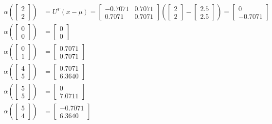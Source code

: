 \documentclass[fleqn]{article}
\begin{document}
\begin{description}
\begin{align*}
        \alpha \left ( \begin{bmatrix}2 \\ 2\end{bmatrix} \right ) &= U^T(x - \mu) = \begin{bmatrix} -0.7071 & 0.7071 \\ 0.7071 & 0.7071 \end{bmatrix} \left ( \begin{bmatrix}2 \\ 2\end{bmatrix} - \begin{bmatrix} 2.5 \\ 2.5 \end{bmatrix} \right ) = \begin{bmatrix}0 \\ -0.7071\end{bmatrix} \\
        \alpha \left ( \begin{bmatrix}0 \\ 0\end{bmatrix} \right ) &= \begin{bmatrix} 0 \\ 0 \end{bmatrix} \\
        \alpha \left ( \begin{bmatrix}0 \\ 1\end{bmatrix} \right ) &= \begin{bmatrix} 0.7071 \\ 0.7071 \end{bmatrix} \\
        \alpha \left ( \begin{bmatrix}4 \\ 5\end{bmatrix} \right ) &= \begin{bmatrix} 0.7071 \\ 6.3640 \end{bmatrix} \\
        \alpha \left ( \begin{bmatrix}5 \\ 5\end{bmatrix} \right ) &= \begin{bmatrix} 0 \\ 7.0711 \end{bmatrix} \\
        \alpha \left ( \begin{bmatrix}5 \\ 4\end{bmatrix} \right ) &= \begin{bmatrix} -0.7071 \\ 6.3640 \end{bmatrix} \\

\end{align*}
\end{description}
\end{document}
